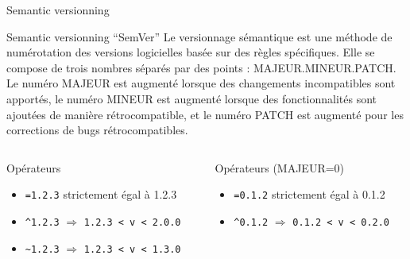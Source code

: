 \begin{frame}{Semantic versionning}
  \begin{block}{Semantic versionning \enquote{SemVer}}
    Le versionnage sémantique  est une méthode de numérotation des versions logicielles basée sur des règles spécifiques.
    Elle se compose de trois nombres séparés par des points : MAJEUR.MINEUR.PATCH.
    Le numéro MAJEUR est augmenté lorsque des changements incompatibles sont apportés, le numéro MINEUR est augmenté lorsque des fonctionnalités sont ajoutées de manière rétrocompatible, et le numéro PATCH est augmenté pour les corrections de bugs rétrocompatibles.
  \end{block}

  \begin{columns}
    \begin{column}{0.48\textwidth}
      \begin{block}{Opérateurs}
        \begin{itemize}
          \item \texttt{=1.2.3} strictement égal à 1.2.3
          \item \texttt{\^{}1.2.3} $\Rightarrow$ \texttt{1.2.3 < v < 2.0.0}
          \item \texttt{\~{}1.2.3} $\Rightarrow$ \texttt{1.2.3 < v < 1.3.0}
        \end{itemize}
      \end{block}
    \end{column}
    \hspace{0.01\textwidth}
    \begin{column}{0.48\textwidth}
      \begin{block}{Opérateurs (MAJEUR=0)}
        \begin{itemize}
          \item \texttt{=0.1.2} strictement égal à 0.1.2
          \item \texttt{\^{}0.1.2} $\Rightarrow$ \texttt{0.1.2 < v < 0.2.0}
        \end{itemize}

        \vspace{1em}
        \vspace{\smallskipamount}
      \end{block}
    \end{column}
  \end{columns}
\end{frame}

